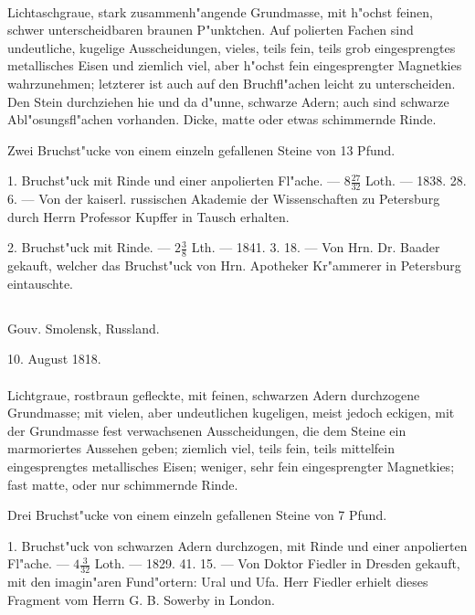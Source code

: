 \documentclass[a4paper, 11pt, oneside, polutonikogreek, german]{article}
\begin{document}
\paragraph{}
Lichtaschgraue, stark zusammenh"angende Grundmasse, mit h"ochst feinen, schwer unterscheidbaren braunen P"unktchen. Auf polierten Fachen sind undeutliche, kugelige Ausscheidungen, vieles, teils fein, teils grob eingesprengtes metallisches Eisen und ziemlich viel, aber h"ochst fein eingesprengter Magnetkies wahrzunehmen; letzterer ist auch auf den Bruchfl"achen leicht zu unterscheiden. Den Stein durchziehen hie und da d"unne, schwarze Adern; auch sind schwarze Abl"osungsfl"achen vorhanden. Dicke, matte oder etwas schimmernde Rinde.

Zwei Bruchst"ucke von einem einzeln gefallenen Steine von 13 Pfund.

1. Bruchst"uck mit Rinde und einer anpolierten Fl"ache. --- $8\frac{27}{32}$ Loth. --- 1838. 28. 6. --- Von der kaiserl. russischen Akademie der Wissenschaften zu Petersburg durch Herrn Professor Kupffer in Tausch erhalten.

2. Bruchst"uck mit Rinde. --- $2\frac{3}{8}$ Lth. --- 1841. 3. 18. --- Von Hrn. Dr. Baader gekauft, welcher das Bruchst"uck von Hrn. Apotheker Kr"ammerer in Petersburg eintauschte.
\subsection{}
\begin{center}

Gouv. Smolensk, Russland.

10. August 1818.
\end{center}
\paragraph{}
Lichtgraue, rostbraun gefleckte, mit feinen, schwarzen Adern durchzogene Grundmasse; mit vielen, aber undeutlichen kugeligen, meist jedoch eckigen, mit der Grundmasse fest verwachsenen Ausscheidungen, die dem Steine ein marmoriertes Aussehen geben; ziemlich viel, teils fein, teils mittelfein eingesprengtes metallisches Eisen; weniger, sehr fein eingesprengter Magnetkies; fast matte, oder nur schimmernde Rinde.

Drei Bruchst"ucke von einem einzeln gefallenen Steine von 7 Pfund.

1. Bruchst"uck von schwarzen Adern durchzogen, mit Rinde und einer anpolierten Fl"ache. --- $4\frac{3}{32}$ Loth. --- 1829. 41. 15. --- Von Doktor Fiedler in Dresden gekauft, mit den imagin"aren Fund"ortern: Ural und Ufa. Herr Fiedler erhielt dieses Fragment vom Herrn G. B. Sowerby in London.
\end{document}

